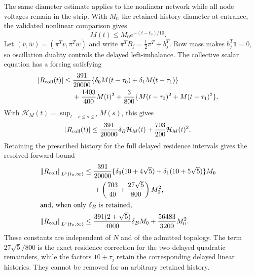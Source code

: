 The same diameter estimate applies to the nonlinear network while all node
voltages remain in the strip.  With \(M_0\) the retained-history diameter at
entrance, the validated nonlinear comparison gives
\begin{equation}
 M(t)\le M_0e^{-(t-t_0)/10}.                            \label{eq:nonlinear-sync}
\end{equation}
Let \((\bar v,\bar w)=(\pi^Tv,\pi^Tw)\) and write
\(\pi^TB_j=\frac12\pi^T+b_j^T\).  Row mass makes
\(b_j^T\mathbf1=0\), so oscillation duality controls the delayed
left-imbalance.  The collective scalar equation has a forcing satisfying
\begin{align}
 |R_{\rm coll}(t)|\le{}&
 \frac{391}{20000}
 \{\delta_0M(t-\tau_0)+\delta_1M(t-\tau_1)\}\notag\\
 &+\frac{1403}{400}M(t)^2
 +\frac3{800}\{M(t-\tau_0)^2+M(t-\tau_1)^2\}.          \label{eq:collective-defect-resolved}
 \end{align}
With \(\mathcal H_M(t)=\sup_{t-r\le s\le t}M(s)\), this gives
 \begin{equation}
 |R_{\rm coll}(t)|
 \le\frac{391}{20000}\delta_B\mathcal H_M(t)
    +\frac{703}{200}\mathcal H_M(t)^2.                 \label{eq:collective-defect-envelope}
 \end{equation}
Retaining the prescribed history for the full delayed residence intervals
gives the resolved forward bound
 \begin{align}
 \left\lVert R_{\rm coll}\right\rVert_{L^1(t_0,\infty)}
 \le{}&\frac{391}{20000}
 \{\delta_0(10+4\sqrt5)+\delta_1(10+5\sqrt5)\}M_0\notag\\
 &+\left(\frac{703}{40}+\frac{27\sqrt5}{800}\right)M_0^2,\label{eq:collective-defect-resolved-L1}\\
 \intertext{and, when only \(\delta_B\) is retained,}
 \left\lVert R_{\rm coll}\right\rVert_{L^1(t_0,\infty)}
 \le{}&\frac{391(2+\sqrt5)}{4000}\delta_BM_0
       +\frac{56483}{3200}M_0^2.                       \label{eq:collective-defect}
 \end{align}
These constants are independent of \(N\) and of the admitted topology.
The term \(27\sqrt5/800\) is the exact residence correction for the two
delayed quadratic remainders, while the factors \(10+\tau_j\) retain the
corresponding delayed linear histories.  They cannot be removed for an
arbitrary retained history.

